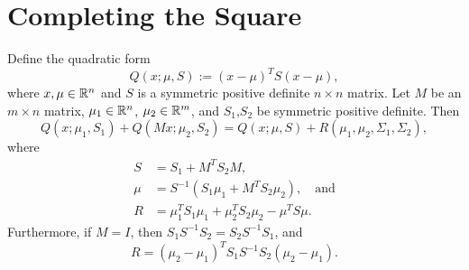 \documentclass[12pt,leqno]{article}
\begin{document}
\section{Completing the Square} 
\begin{Lem}
 Define the quadratic form
  $$
 Q(x;\mu,S) := (x-\mu)^TS(x-\mu),
  $$
  where $x,\mu\in {\mathbb R}^n$ and  $S$ is a symmetric positive definite $n\times{n}$
  matrix. Let $M$ be an $m\times{n}$ matrix, $\mu_1\in{\mathbb R}^n$, $\mu_2\in{\mathbb R}^m$,
  and $S_1$,$S_2$ be symmetric positive definite.  Then 
\begin{equation}\label{comp_sq:1}
  Q(x;\mu_1,S_1)+Q(Mx;\mu_2,S_2) = Q(x;\mu,S) + R(\mu_1,\mu_2,\Sigma_1,\Sigma_2),
\end{equation}
where 
\begin{align}
S &= S_1 + M^TS_2M, \label{sigma}\\
\mu &= S^{-1}(S_1\mu_1 + M^TS_2\mu_2),\quad\text{and}\label{mu}\\
R &= \mu_1^TS_1\mu_1 + \mu_2^TS_2\mu_2 - \mu^TS\mu. \label{R_def} 
\end{align}
Furthermore, if $M = I$, then $S_1S^{-1}S_2 = S_2S^{-1}S_1$,  and
\begin{equation}\label{comp_sq:R}
R = (\mu_2-\mu_1)^TS_1S^{-1}S_2(\mu_2-\mu_1).
\end{equation}
\end{Lem}
\end{document}
